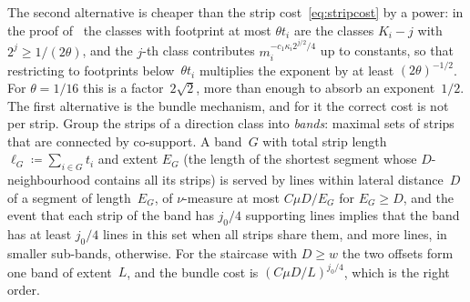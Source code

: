 \documentclass[11pt,letterpaper]{article}
\begin{document}
The second alternative is cheaper than the strip cost~\eqref{eq:stripcost} by a power: in the proof of~\cite[Theorem~2.1]{SC26} the classes with footprint at most $\theta t_i$ are the classes $K_i-j$ with $2^j\ge1/(2\theta)$, and the $j$-th class contributes $m_i^{-c_1\kappa_i2^{j/2}/4}$ up to constants, so that restricting to footprints below~$\theta t_i$ multiplies the exponent by at least $(2\theta)^{-1/2}$. For $\theta=1/16$ this is a factor~$2\sqrt2$, more than enough to absorb an exponent~$1/2$. The first alternative is the bundle mechanism, and for it the correct cost is not per strip. Group the strips of a direction class into \emph{bands}: maximal sets of strips that are connected by co-support. A band~$G$ with total strip length $\ell_G\coloneqq\sum_{i\in G}t_i$ and extent $E_G$ (the length of the shortest segment whose $D$-neighbourhood contains all its strips) is served by lines within lateral distance~$D$ of a segment of length~$E_G$, of $\nu$-measure at most $C\mu D/E_G$ for $E_G\ge D$, and the event that each strip of the band has $j_0/4$ supporting lines implies that the band has at least $j_0/4$ lines in this set when all strips share them, and more lines, in smaller sub-bands, otherwise. For the staircase with $D\ge w$ the two offsets form one band of extent~$L$, and the bundle cost is $(C\mu D/L)^{j_0/4}$, which is the right order.
\end{document}
